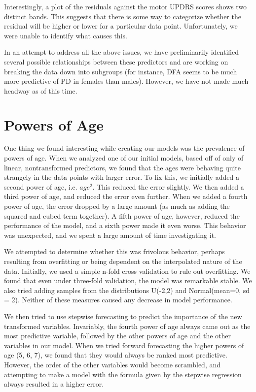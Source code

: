 \documentclass{report}
\begin{document}
Interestingly, a plot of the residuals against the motor UPDRS scores shows two distinct bands. This suggests that there is some way to categorize whether the residual will be higher or lower for a particular data point.
Unfortunately, we were unable to identify what causes this.

In an attempt to address all the above issues, we have preliminarily identified several possible relationships between these predictors and are working on breaking the data down into subgroups (for instance,
DFA seems to be much more predictive of PD in females than males). However, we have not made much headway as of this time.

\section*{Powers of Age}

One thing we found interesting while creating our models was the prevalence of powers of age. When we analyzed one of our initial models, based off of only of linear, nontransformed predictors, we found
that the ages were behaving quite strangely in the data points with larger error. To fix this, we initially added a second power of age, i.e. $age^2$. This reduced the error slightly. We then added a third power 
of age, and reduced the error even further. When we added a fourth power of age, the error dropped by a large amount (as much as adding the squared and cubed term together). A fifth power of age, however, reduced the performance of the model, and a sixth power made it even worse. This behavior was unexpected, and we spent
a large amount of time investigating it.

We attempted to determine whether this was frivolous behavior, perhaps resulting from overfitting or being dependent on the
interpolated nature of the data. Initially, we used a simple n-fold cross validation to rule out overfitting. We found that even under three-fold validation,
the model was remarkable stable. We also tried adding samples from the distributions U(-2,2) and Normal(mean=0, sd = 2). Neither of these measures caused any
decrease in model performance.

We then tried to use stepwise forecasting to predict the importance of the new transformed variables. Invariably, the fourth power of age always came out
as the most predictive variable, followed by the other powers of age and the other variables in our model. When we tried forward forecasting the higher powers of 
age (5, 6, 7), we found that they would always be ranked most predictive. However, the order of the other variables would become scrambled, and attempting to make
a model with the formula given by the stepwise regression always resulted in a higher error.
\end{document}
